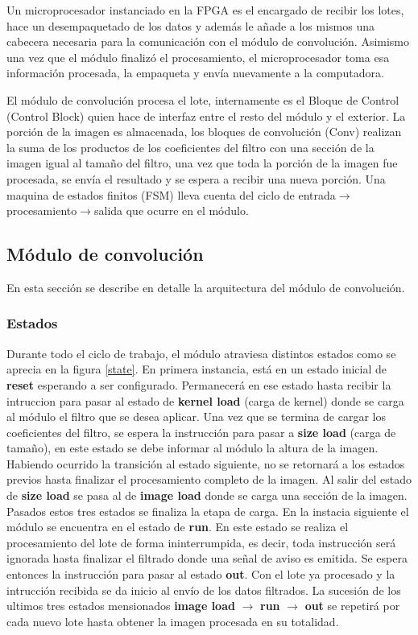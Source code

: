 \documentclass[conference,compsoc]{IEEEtran}
\begin{document}
Un microprocesador instanciado en la FPGA es el encargado de recibir los lotes,
hace un desempaquetado de los datos y adem\'as le a\~nade a los mismos una 
cabecera necesaria para la comunicaci\'on con el m\'odulo de convoluci\'on.
Asimismo una vez que el m\'odulo finaliz\'o el procesamiento, el microprocesador 
toma esa informaci\'on procesada, la empaqueta y env\'ia nuevamente a la
computadora.

El m\'odulo de convoluci\'on procesa el lote, internamente es el Bloque de
Control (Control Block) quien hace de interfaz entre el resto del m\'odulo y el
exterior. La porci\'on de la imagen es almacenada, los bloques de convoluci\'on
(Conv) realizan la suma de los productos de los coeficientes del filtro con una
secci\'on de la imagen igual al tama\~no del filtro, una vez que toda la
porci\'on de la imagen fue procesada, se env\'ia el resultado y se espera a
recibir una nueva porci\'on. Una maquina de estados finitos (FSM) lleva cuenta
del ciclo de entrada$\rightarrow$procesamiento$\rightarrow$salida que ocurre en
el m\'odulo.

\subsection{M\'odulo de convoluci\'on}
En esta secci\'on se describe en detalle la arquitectura del m\'odulo de
convoluci\'on.

\subsubsection{Estados}
Durante todo el ciclo de trabajo, el m\'odulo atraviesa distintos estados como
se aprecia en la figura \ref{state}. En primera instancia, est\'a en un estado
inicial de \textbf{reset} esperando a ser configurado. Permanecer\'a en ese
estado hasta recibir la intruccion para pasar al estado de \textbf{kernel load}
(carga de kernel) donde se carga al m\'odulo el filtro que se desea aplicar. Una
vez que se termina de cargar los coeficientes 
del filtro, se espera la instrucci\'on para pasar a \textbf{size load} (carga
de tama\~no), en este estado se debe informar al m\'odulo la altura de la
imagen. Habiendo ocurrido la transici\'on al estado siguiente, no se retornar\'a
a los estados previos hasta finalizar el procesamiento completo de la imagen.
Al salir del estado de \textbf{size load} se pasa al de \textbf{image load}
donde se carga una secci\'on de la imagen. Pasados estos tres estados se
finaliza la etapa de carga. En la instacia siguiente el m\'odulo se encuentra en
el estado de \textbf{run}. En este estado se realiza el procesamiento del lote
de forma ininterrumpida, es decir, toda instrucci\'on ser\'a ignorada hasta
finalizar el filtrado donde una se\~nal de aviso es emitida. Se espera entonces
la instrucci\'on para pasar al estado \textbf{out}. Con el lote ya procesado y
la intrucci\'on recibida se da inicio al env\'io de los datos filtrados. La
sucesi\'on de los ultimos tres estados mensionados \textbf{image load}
$\rightarrow$ \textbf{run} $\rightarrow$ \textbf{out} se repetir\'a por cada
nuevo lote hasta obtener la imagen procesada en su totalidad.
\end{document}
